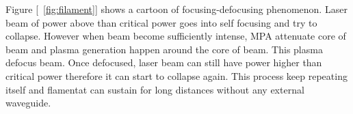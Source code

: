 \documentclass[../main.tex]{subfiles}
\begin{document}
	Figure [~\ref{fig:filament}] shows a cartoon of focusing-defocusing
	phenomenon. Laser beam of power above than critical power goes into self
	focusing and try to collapse. However when beam become sufficiently
	intense, MPA attenuate core of beam and plasma generation happen around
	the core of beam. This plasma defocus beam. Once defocused, laser beam
	can still have power higher than critical power therefore it can start
	to collapse again. This process keep repeating itself and flamentat can
	sustain for long distances without any external waveguide.
\end{document}
